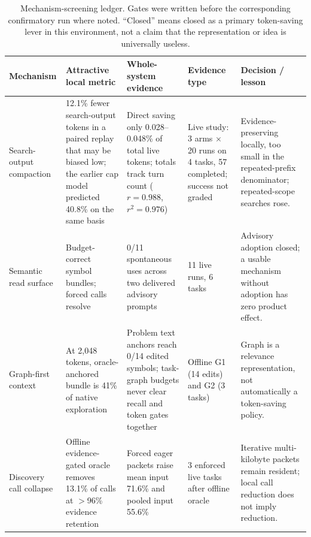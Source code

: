 \documentclass[10pt,twocolumn]{article}
\begin{document}
\begin{table}[t]
\centering
\caption{Mechanism-screening ledger.  Gates were written before the corresponding confirmatory run
where noted.  ``Closed'' means closed as a primary token-saving lever in this environment, not a claim
that the representation or idea is universally useless.}
\label{tab:negative}
\small
\begin{tabularx}{\textwidth}{p{}p{}p{}p{}X}
\toprule
Mechanism & Attractive local metric & Whole-system evidence & Evidence type & Decision / lesson \\
\midrule
Search-output compaction & 12.1\% fewer search-output tokens in a paired replay that may be biased
low; the earlier cap model predicted 40.8\% on the same basis & Direct saving only 0.028--0.048\% of
total live tokens; totals track turn count ($r=0.988$, $r^2=0.976$) & Live study: 3 arms $\times$ 20
runs on 4 tasks, 57 completed; success not graded & Evidence-preserving locally, too small in the
repeated-prefix denominator; repeated-scope searches rose. \\
Semantic read surface & Budget-correct symbol bundles; forced calls resolve & 0/11 spontaneous uses
across two delivered advisory prompts & 11 live runs, 6 tasks & Advisory adoption closed; a usable
mechanism without adoption has zero product effect. \\
Graph-first context & At 2,048 tokens, oracle-anchored bundle is 41\% of native exploration & Problem
text anchors reach 0/14 edited symbols; task-graph budgets never clear recall and token gates together
& Offline G1 (14 edits) and G2 (3 tasks) & Graph is a relevance representation, not automatically a
token-saving policy. \\
Discovery call collapse & Offline evidence-gated oracle removes 13.1\% of calls at $>$96\% evidence
retention & Forced eager packets raise mean input 71.6\% and pooled input 55.6\% & 3 enforced live
tasks after offline oracle & Iterative multi-kilobyte packets remain resident; local call reduction
does not imply \tokensturn{} reduction. \\
\bottomrule
\end{tabularx}
\end{table}
\end{document}
